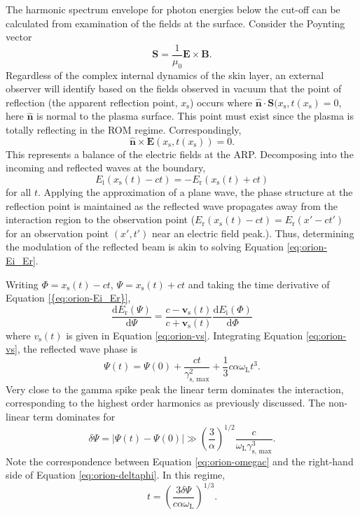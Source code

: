 The harmonic spectrum envelope for photon energies below the cut-off can be calculated from examination of the fields at the surface. 
Consider the Poynting vector
\begin{equation}
	\mathbf{S} = \frac{1}{\mu_0}\mathbf{E}\times\mathbf{B}.
\end{equation}
Regardless of the complex internal dynamics of the skin layer, an external observer will identify based on the fields observed in vacuum that the point of reflection (the apparent reflection point, $x_\mathrm{s}$) occurs where $\hat{\mathbf{n}}\cdot\mathbf{S}(x_\mathrm{s},t(x_\mathrm{s}) = 0$, here $\hat{\mathbf{n}}$ is normal to the plasma surface. This point must exist since the plasma is totally reflecting in the ROM regime. Correspondingly,
\begin{equation}
	\hat{\mathbf{n}}\times \mathbf{E}(x_\mathrm{s},t(x_\mathrm{s})) = 0.
\end{equation}
This represents a balance of the electric fields at the ARP. Decomposing into the incoming and reflected waves at the boundary,
\begin{equation}\label{eq:orion-Ei_Er}
	E_\mathrm{i}(x_\mathrm{s}(t) - ct) = - E_\mathrm{r}(x_\mathrm{s}(t) + ct)
\end{equation}
for all $t$. Applying the approximation of a plane wave, the phase structure at the reflection point is maintained as the reflected wave propagates away from the interaction region to the observation point ($E_\mathrm{r}(x_\mathrm{s}(t) - ct) = E_\mathrm{r}(x' - ct')$ for an observation point $(x',t')$ near an electric field peak.). Thus, determining the modulation of the reflected beam is akin to solving Equation \ref{eq:orion-Ei_Er}. 

Writing $\Phi = x_\mathrm{s}(t) - ct$, $\Psi = x_\mathrm{s}(t) + ct$ and taking the time derivative of Equation \ref{{eq:orion-Ei_Er}},
\begin{equation}
	\frac{\mathrm{d}E_\mathrm{r}(\Psi)}{\mathrm{d}\Psi} = \frac{c - \mathbf{v}_\mathrm{s}(t)}{c+\mathbf{v}_\mathrm{s}(t)}\frac{\mathrm{d}E_\mathrm{i}(\Phi)}{\mathrm{d}\Phi}
\end{equation}
where $v_\mathrm{s}(t)$ is given in Equation \ref{eq:orion-vs}. Integrating Equation \ref{eq:orion-vs}, the reflected wave phase is
\begin{equation}
	\Psi(t) = \Psi(0) + \frac{ct}{\gamma_\mathrm{s,\, max}^2} + \frac{1}{3}c\alpha \omega_\mathrm{L}t^3.
\end{equation}
Very close to the gamma spike peak the linear term dominates the interaction, corresponding to the highest order harmonics as previously discussed. The non-linear term dominates for 
\begin{equation}\label{eq:orion-deltaphi}
	\delta \Psi = |\Psi(t) - \Psi(0)| \gg \left(\frac{3}{\alpha}\right)^{1/2}\frac{c}{\omega_\mathrm{L}\gamma_\mathrm{s,\, max}^3}.
\end{equation}
Note the correspondence between Equation \ref{eq:orion-omegac} and the right-hand side of Equation \ref{eq:orion-deltaphi}. In this regime,
\begin{equation}
	t = \left(\frac{3\delta \Psi }{c\alpha \omega_\mathrm{L}}\right)^{1/3}.
\end{equation}


